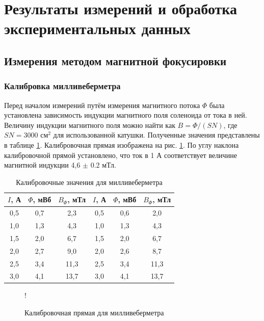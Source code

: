 \documentclass[a4paper,12pt]{article} %
\begin{document}
\section{Результаты измерений и обработка экспериментальных данных}

\subsection{Измерения методом магнитной фокусировки}

\subsubsection{Калибровка милливеберметра}

Перед началом измерений путём измерения магнитного потока $\Phi$ была установлена зависимость индукции магнитного поля соленоида от тока в ней. Величину индукции магнитного поля можно найти как $B = \Phi/(SN)$, где $SN = 3000$ см$^2$ для использованной катушки. Полученные значения представлены в таблице \ref{tab:calibration}. Калибровочная прямая изображена на рис. \ref{graph:calibration}. По углу наклона калибровочной прямой установлено, что ток в 1 А соответствует величине магнитной индукции 4,6 $\pm$ 0.2 мТл.

\begin{table}
\centering
\begin{tabular}{|c|c|c|c|c|c|}
\hline
$I$, А & $\Phi$, мВб & $B_\Phi$, мТл & $I$, А & $\Phi$, мВб & $B_\Phi$, мТл \\ \hline
0,5 & 0,7 & 2,3 & 0,5 & 0,6 & 2,0 \\ \hline
1,0 & 1,3 & 4,3 & 1,0 & 1,3 & 4,3 \\ \hline
1,5 & 2,0 & 6,7 & 1,5 & 2,0 & 6,7 \\ \hline
2,0 & 2,7 & 9,0 & 2,0 & 2,6 & 8,7 \\ \hline
2,5 & 3,4 & 11,3 & 2,5 & 3,4 & 11,3 \\ \hline
3,0 & 4,1 & 13,7 & 3,0 & 4,1 & 13,7 \\ \hline
\end{tabular}
\caption{Калибровочные значения для милливеберметра}
\label{tab:calibration}
\end{table}

\begin{figure}
\centering
{} {!} {
}
\caption{Калибровочная прямая для милливеберметра}
\label{graph:calibration}
\end{figure}
\end{document}

